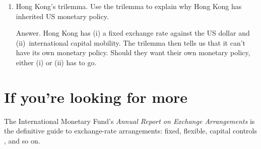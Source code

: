 \begin{enumerate}
\item Hong Kong's trilemma.
Use the trilemma to explain why Hong Kong has inherited US monetary policy.

Answer.  Hong Kong has (i) a fixed exchange rate against the US dollar and
(ii)~international capital mobility.
The trilemma then tells us that it can't have its own monetary policy.
Should they want their own monetary policy, either (i) or (ii) has to go.
\end{enumerate}
\setlength{\leftmargini}{\oldleftmargini}


\section*{If you're looking for more}

The International Monetary Fund's
{\it Annual Report on Exchange Arrangements\/}
is the definitive guide to exchange-rate arrangements:  fixed,
flexible, capital controls  , and so on.
